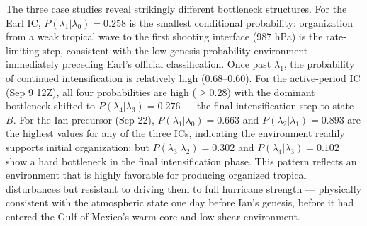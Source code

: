 \documentclass[11pt]{article}
\begin{document}
\begin{table}[htbp]
\centering
\caption{Conditional transition probabilities $P(\lambda_{i+1}|\lambda_i)$ for the three case-study ICs and all-98-IC aggregate statistics. $N_{\text{rej}}$ is the number of CPS-rejected (extratropical) trajectories at $\lambda_1$ as a fraction of attempts, reflecting the CPS contamination screen. The product $\prod P_i$ is $P(\lambda_4|\lambda_0)$, the probability that a trajectory at $\lambda_0$ reaches state~$B$. Target ensemble: $N_{\text{shoot}} = 2000$ per interface.}
\label{tab:shooting_results}
\end{table}

The three case studies reveal strikingly different bottleneck structures. For the Earl IC, $P(\lambda_1|\lambda_0) = 0.258$ is the smallest conditional probability: organization from a weak tropical wave to the first shooting interface (987 hPa) is the rate-limiting step, consistent with the low-genesis-probability environment immediately preceding Earl's official classification. Once past $\lambda_1$, the probability of continued intensification is relatively high (0.68--0.60). For the active-period IC (Sep 9 12Z), all four probabilities are high ($\geq$0.28) with the dominant bottleneck shifted to $P(\lambda_4|\lambda_3) = 0.276$ --- the final intensification step to state~$B$. For the Ian precursor (Sep 22), $P(\lambda_1|\lambda_0) = 0.663$ and $P(\lambda_2|\lambda_1) = 0.893$ are the highest values for any of the three ICs, indicating the environment readily supports initial organization; but $P(\lambda_3|\lambda_2) = 0.302$ and $P(\lambda_4|\lambda_3) = 0.102$ show a hard bottleneck in the final intensification phase. This pattern reflects an environment that is highly favorable for producing organized tropical disturbances but resistant to driving them to full hurricane strength --- physically consistent with the atmospheric state one day before Ian's genesis, before it had entered the Gulf of Mexico's warm core and low-shear environment.
\end{document}
